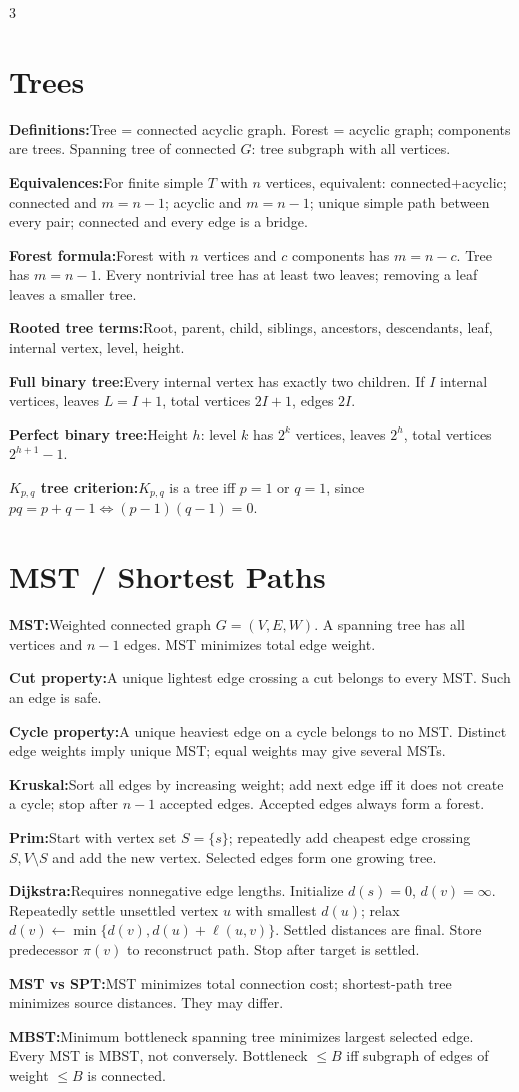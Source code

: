 \documentclass[10pt]{article}
\newenvironment{cheatitems}{\par\vspace{-1pt}}{\par\vspace{-1pt}}
\newcommand{\cheatrow}[2]{\par\noindent\textbf{#1:}\enspace #2\par}
\begin{document}
\begin{multicols}{3}
\section*{Trees}
\begin{cheatitems}
\cheatrow{Definitions}{Tree = connected acyclic graph. Forest = acyclic graph; components are trees. Spanning tree of connected $G$: tree subgraph with all vertices.}
\cheatrow{Equivalences}{For finite simple $T$ with $n$ vertices, equivalent: connected+acyclic; connected and $m=n-1$; acyclic and $m=n-1$; unique simple path between every pair; connected and every edge is a bridge.}
\cheatrow{Forest formula}{Forest with $n$ vertices and $c$ components has $m=n-c$. Tree has $m=n-1$. Every nontrivial tree has at least two leaves; removing a leaf leaves a smaller tree.}
\cheatrow{Rooted tree terms}{Root, parent, child, siblings, ancestors, descendants, leaf, internal vertex, level, height.}
\cheatrow{Full binary tree}{Every internal vertex has exactly two children. If $I$ internal vertices, leaves $L=I+1$, total vertices $2I+1$, edges $2I$.}
\cheatrow{Perfect binary tree}{Height $h$: level $k$ has $2^k$ vertices, leaves $2^h$, total vertices $2^{h+1}-1$.}
\cheatrow{$K_{p,q}$ tree criterion}{$K_{p,q}$ is a tree iff $p=1$ or $q=1$, since $pq=p+q-1\iff(p-1)(q-1)=0$.}
\end{cheatitems}

\section*{MST / Shortest Paths}
\begin{cheatitems}
\cheatrow{MST}{Weighted connected graph $G=(V,E,W)$. A spanning tree has all vertices and $n-1$ edges. MST minimizes total edge weight.}
\cheatrow{Cut property}{A unique lightest edge crossing a cut belongs to every MST. Such an edge is safe.}
\cheatrow{Cycle property}{A unique heaviest edge on a cycle belongs to no MST. Distinct edge weights imply unique MST; equal weights may give several MSTs.}
\cheatrow{Kruskal}{Sort all edges by increasing weight; add next edge iff it does not create a cycle; stop after $n-1$ accepted edges. Accepted edges always form a forest.}
\cheatrow{Prim}{Start with vertex set $S=\{s\}$; repeatedly add cheapest edge crossing $S,V\setminus S$ and add the new vertex. Selected edges form one growing tree.}
\cheatrow{Dijkstra}{Requires nonnegative edge lengths. Initialize $d(s)=0$, $d(v)=\infty$. Repeatedly settle unsettled vertex $u$ with smallest $d(u)$; relax $d(v)\leftarrow\min\{d(v),d(u)+\ell(u,v)\}$. Settled distances are final. Store predecessor $\pi(v)$ to reconstruct path. Stop after target is settled.}
\cheatrow{MST vs SPT}{MST minimizes total connection cost; shortest-path tree minimizes source distances. They may differ.}
\cheatrow{MBST}{Minimum bottleneck spanning tree minimizes largest selected edge. Every MST is MBST, not conversely. Bottleneck $\le B$ iff subgraph of edges of weight $\le B$ is connected.}
\end{cheatitems}


\end{multicols}
\end{document}
